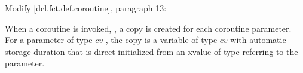 Modify [dcl.fct.def.coroutine], paragraph 13:
\begin{adjustwidth}{0.5cm}{0.5cm}
When a coroutine is invoked, , a copy is created for each coroutine parameter. For a parameter of type $cv$ , the copy is a variable of type $cv$  with automatic storage duration that is direct-initialized from an xvalue of type  referring to the parameter.
\end{adjustwidth}




\renewcommand{\addcontentsline}[3]{}%







